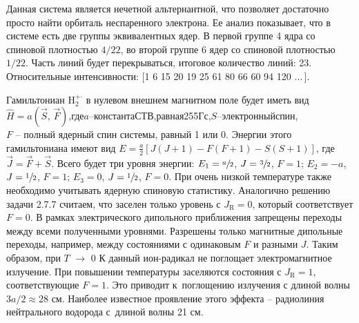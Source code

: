  Данная система является нечетной альтернантной, что позволяет достаточно просто найти орбиталь неспаренного электрона. Ее анализ показывает, что в системе есть две группы эквивалентных ядер. В первой группе 4 ядра со спиновой плотностью $4/22$, во второй группе 6 ядер со спиновой плотностью $1/22$. Часть линий будет перекрываться, итоговое количество линий: 23. Относительные интенсивности: [1 6 15 20 19 25 61 80 66 60 94 120 $\ldots\,$].\par
{} Гамильтониан $\text{H}_2^{+\boldsymbol{\cdot}}$ в нулевом внешнем магнитном поле будет иметь вид $\widehat{H}=a(\vec{S},\,\vec{F})$,\hspace{\fill}где\hspace{\fill}$a$\hspace{\fill}–\hspace{\fill}константа\hspace{\fill}СТВ,\hspace{\fill}равная\hspace{\fill}255\hspace{\fill}Гс,\hspace{\fill}$S$\hspace{\fill}–\hspace{\fill}электронный\hspace{\fill}спин,\\$F$ – полный ядерный спин системы, равный 1 или 0. Энергии этого гамильтониана имеют вид $E = \frac{a}{2} \left[ J(J+1) - F(F+1) - S(S+1) \right]$, где $\vec{J} = \vec{F} + \vec{S}$. Всего будет три уровня энергии: $E_1=\sfrac{a}{2}$, $J=\sfrac32$, $F=1$; $E_2=-a$, $J=\sfrac12$, $F=1$; $E_3=0$, $J=\sfrac12$, $F=0$. При очень низкой температуре также необходимо учитывать ядерную спиновую статистику. Аналогично решению задачи 2.7.7 считаем, что заселен только уровень с $J_{\text{R}}=0$, который соответствует $F=0$. В рамках электрического дипольного приближения запрещены переходы между всеми полученными уровнями. Разрешены только магнитные дипольные переходы, например, между состояниями с одинаковым $F$ и разными $J$. Таким образом, при $T$ $\rightarrow$ 0 К данный ион-радикал не поглощает электромагнитное излучение. При повышении температуры заселяются состояния с $J_{\text{R}}=1$, соответствующие $F=1$. Это приводит к~поглощению излучения с длиной волны $3a/2 \approx 28$ см. Наиболее известное проявление этого эффекта – радиолиния нейтрального водорода с~длиной волны 21 см.\par
